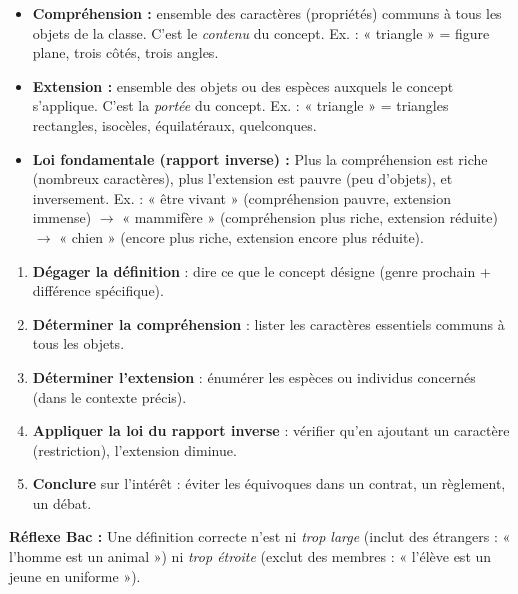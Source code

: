 \documentclass[11pt]{article}
\begin{document}
\begin{propriete}
\begin{itemize}
\item \textbf{Compréhension :} ensemble des caractères (propriétés) communs à tous les objets de la classe. C'est le \emph{contenu} du concept. Ex. : « triangle » = figure plane, trois côtés, trois angles.
\item \textbf{Extension :} ensemble des objets ou des espèces auxquels le concept s'applique. C'est la \emph{portée} du concept. Ex. : « triangle » = triangles rectangles, isocèles, équilatéraux, quelconques.
\item \textbf{Loi fondamentale (rapport inverse) :} Plus la compréhension est riche (nombreux caractères), plus l'extension est pauvre (peu d'objets), et inversement. Ex. : « être vivant » (compréhension pauvre, extension immense) $\rightarrow$ « mammifère » (compréhension plus riche, extension réduite) $\rightarrow$ « chien » (encore plus riche, extension encore plus réduite).
\end{itemize}
\end{propriete}

\begin{methode}
\begin{enumerate}
\item \textbf{Dégager la définition} : dire ce que le concept désigne (genre prochain + différence spécifique).
\item \textbf{Déterminer la compréhension} : lister les caractères essentiels communs à tous les objets.
\item \textbf{Déterminer l'extension} : énumérer les espèces ou individus concernés (dans le contexte précis).
\item \textbf{Appliquer la loi du rapport inverse} : vérifier qu'en ajoutant un caractère (restriction), l'extension diminue.
\item \textbf{Conclure} sur l'intérêt : éviter les équivoques dans un contrat, un règlement, un débat.
\end{enumerate}
\textbf{Réflexe Bac :} Une définition correcte n'est ni \emph{trop large} (inclut des étrangers : « l'homme est un animal ») ni \emph{trop étroite} (exclut des membres : « l'élève est un jeune en uniforme »).
\end{methode}
\end{document}
